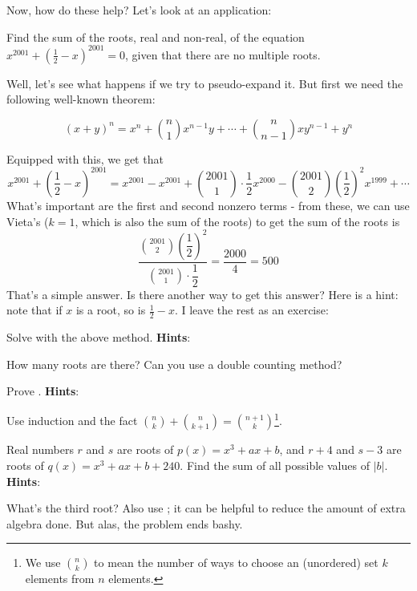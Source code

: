 \documentclass[11pt,titlepage]{scrartcl}
\newenvironment{hint}{\footnotesize \normalfont \textbf{Hints}:}{\hspace{-0.5ex}}
\begin{document}
Now, how do these help? Let's look at an application:
\begin{example}\label{sketch}
Find the sum of the roots, real and non-real, of the equation $x^{2001}+\left(\frac 12-x\right)^{2001}=0$, given that there are no multiple roots.
\end{example}
Well, let's see what happens if we try to pseudo-expand it. But first we need the following well-known theorem:
\begin{theorem}\label{binomthm}
\[(x+y)^n=x^n+\binom n1x^{n-1}y+\cdots+\binom n{n-1}xy^{n-1}+y^n\]
\end{theorem}
Equipped with this, we get that
\[x^{2001}+\left(\frac 12-x\right)^{2001}=x^{2001}-x^{2001}+\binom{2001}{1}\cdot\dfrac 12x^{2000}-\binom{2001}{2}\left(\dfrac 12\right)^2x^{1999}+\cdots\]
What's important are the first and second nonzero terms - from these, we can use Vieta's ($k=1$, which is also the sum of the roots) to get the sum of the roots is
\[\dfrac{\binom{2001}{2}\left(\dfrac 12\right)^2}{\binom{2001}{1}\cdot\dfrac 12}=\dfrac{2000}4=\boxed{500}\]
That's a simple answer. Is there another way to get this answer? Here is a hint: note that if $x$ is a root, so is $\tfrac 12-x$. I leave the rest as an exercise:
\begin{exercisebox}
\begin{exercise}
Solve  with the above method.
\begin{hint}
\begin{addhint}{
How many roots are there? Can you use a double counting method?
}\end{addhint}
\end{hint}
\end{exercise}
\begin{exercise}
Prove .
\begin{hint}
\begin{addhint}{
Use induction and the fact $\binom nk+\binom n{k+1}=\binom{n+1}{k}$\footnote{We use $\binom{n}{k}$ to mean the number of ways to choose an (unordered) set $k$ elements from $n$ elements.}.
}\end{addhint}
\end{hint}
\end{exercise}
\begin{exercise}
Real numbers $r$ and $s$ are roots of $p(x)=x^3+ax+b$, and $r+4$ and $s-3$ are roots of $q(x)=x^3+ax+b+240$. Find the sum of all possible values of $|b|$.
\begin{hint}
\begin{addhint}{
What's the third root? Also use ; it can be helpful to reduce the amount of extra algebra done. But alas, the problem ends bashy.
}\end{addhint}
\end{hint}
\end{exercise}
\end{exercisebox}
\end{document}
